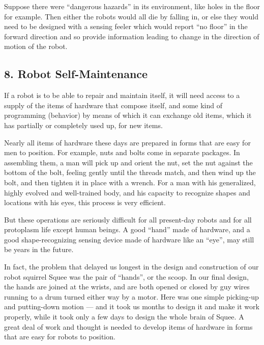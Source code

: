 \documentclass[11pt]{article}
\begin{document}
Suppose there were ``dangerous hazards'' in its environment, like holes in the
floor for example. Then either the robots would all die by falling in, or else
they would need to be designed with a sensing feeler which would report ``no
floor'' in the forward direction and so provide information leading to change in
the direction of motion of the robot.

\subsection*{8. Robot Self-Maintenance}

If a robot is to be able to repair and maintain itself, it will need access to
a supply of the items of hardware that compose itself, and some kind of
programming (behavior) by means of which it can exchange old items, which it
has partially or completely used up, for new items.

Nearly all items of hardware these days are prepared in forms that are easy for
men to position. For example, nuts and bolts come in separate packages. In
assembling them, a man will pick up and orient the nut, set the nut against the
bottom of the bolt, feeling gently until the threads match, and then wind up
the bolt, and then tighten it in place with a wrench. For a man with his
generalized, highly evolved and well-trained body, and his capacity to
recognize shapes and locations with his eyes, this process is very efficient.

But these operations are seriously difficult for all present-day robots and for
all protoplasm life except human beings. A good ``hand'' made of hardware, and
a good shape-recognizing sensing device made of hardware like an ``eye'', may
still be years in the future.

In fact, the problem that delayed us longest in the design and construction of
our robot squirrel Squee was the pair of ``hands'', or the scoop. In our final
design, the hands are joined at the wrists, and are both opened or closed by
guy wires running to a drum turned either way by a motor. Here was one simple
picking-up and putting-down motion --- and it took us months to design it and
make it work properly, while it took only a few days to design the whole brain
of Squee. A great deal of work and thought is needed to develop items of
hardware in forms that are easy for robots to position.
\end{document}
